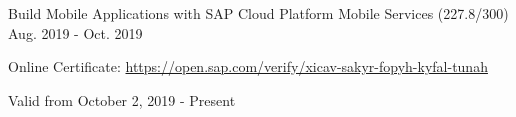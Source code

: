 
\begin{cventries}

\vspace{-0.25cm}

  \cventry
    {Build Mobile Applications with SAP Cloud Platform Mobile Services (227.8/300)} %
    {} %
    {} %
    {Aug. 2019 - Oct. 2019} %
    {
	    \begin{cvitems} %
        \item[] {Online Certificate: \url{https://open.sap.com/verify/xicav-sakyr-fopyh-kyfal-tunah}} %
        \item[] {Valid from October 2, 2019 - Present} %
      \end{cvitems}
    }
    \vspace{-0.1cm}

\end{cventries}

